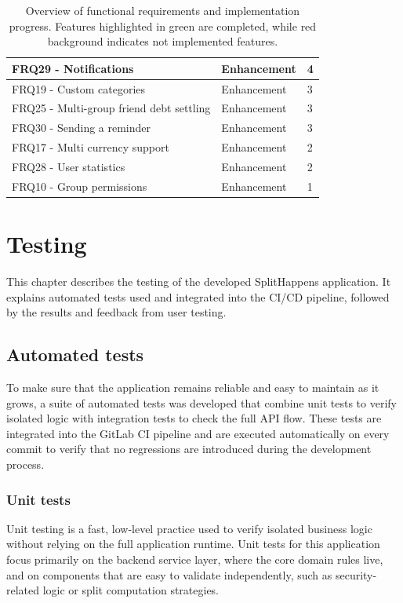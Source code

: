 \documentclass{ctuthesis}
\begin{document}
\begin{table}[ht!]
\begin{tabularx}{\textwidth}{|X|p{2.7cm}|l|}
\rowcolor{green!15} FRQ29 - Notifications & Enhancement & 4 \\ \hline
\rowcolor{red!15}   FRQ19 - Custom categories & Enhancement & 3  \\ \hline
\rowcolor{red!15}   FRQ25 - Multi-group friend debt settling & Enhancement & 3  \\ \hline
\rowcolor{green!15} FRQ30 - Sending a reminder & Enhancement & 3 \\ \hline
\rowcolor{red!15}   FRQ17 - Multi currency support & Enhancement & 2  \\ \hline
\rowcolor{red!15}   FRQ28 - User statistics & Enhancement & 2  \\ \hline
\rowcolor{red!15}   FRQ10 - Group permissions & Enhancement & 1  \\ \hline

\end{tabularx}
\caption{Overview of functional requirements and implementation progress. Features highlighted in green are completed, while red background indicates not implemented features.}
\label{table:impl}
\end{table}

\chapter{Testing}
This chapter describes the testing of the developed SplitHappens application. It explains automated tests used and integrated into the CI/CD pipeline, followed by the results and feedback from user testing.

\section{Automated tests}
To make sure that the application remains reliable and easy to maintain as it grows, a suite of automated tests was developed that combine unit tests to verify isolated logic with integration tests to check the full API flow. These tests are integrated into the GitLab CI pipeline and are executed automatically on every commit to verify that no regressions are introduced during the development process.

\subsection{Unit tests}
Unit testing is a fast, low-level practice used to verify isolated business logic without relying on the full application runtime. Unit tests for this application focus primarily on the backend service layer, where the core domain rules live, and on components that are easy to validate independently, such as security-related logic or split computation strategies. 
\end{document}
